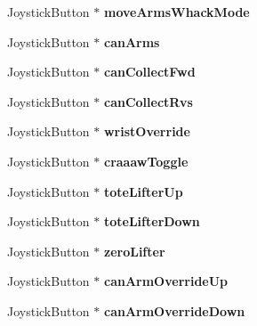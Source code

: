 \begin{DoxyCompactItemize}
\item 
\hypertarget{class_o_i_a2f5f57a5ddbfbfa7d64f2badf07ab1af}{}Joystick\+Button $\ast$ {\bfseries move\+Arms\+Whack\+Mode}\label{class_o_i_a2f5f57a5ddbfbfa7d64f2badf07ab1af}

\item 
\hypertarget{class_o_i_ab1b2d1e372da50b19d3a31ef03c19943}{}Joystick\+Button $\ast$ {\bfseries can\+Arms}\label{class_o_i_ab1b2d1e372da50b19d3a31ef03c19943}

\item 
\hypertarget{class_o_i_a448dc3e19c0890b55b51b83b8fa35567}{}Joystick\+Button $\ast$ {\bfseries can\+Collect\+Fwd}\label{class_o_i_a448dc3e19c0890b55b51b83b8fa35567}

\item 
\hypertarget{class_o_i_acc977a5af7ac481ebb561161384299f8}{}Joystick\+Button $\ast$ {\bfseries can\+Collect\+Rvs}\label{class_o_i_acc977a5af7ac481ebb561161384299f8}

\item 
\hypertarget{class_o_i_ae065075f763eb9a282dd017848e6e279}{}Joystick\+Button $\ast$ {\bfseries wrist\+Override}\label{class_o_i_ae065075f763eb9a282dd017848e6e279}

\item 
\hypertarget{class_o_i_a51da9d9aec6d2f6b89e663428a567f43}{}Joystick\+Button $\ast$ {\bfseries craaaw\+Toggle}\label{class_o_i_a51da9d9aec6d2f6b89e663428a567f43}

\item 
\hypertarget{class_o_i_ae8d9bbb4b6fc16b8ff7a386b55795dcb}{}Joystick\+Button $\ast$ {\bfseries tote\+Lifter\+Up}\label{class_o_i_ae8d9bbb4b6fc16b8ff7a386b55795dcb}

\item 
\hypertarget{class_o_i_ad63f1e29bf862c03f710c422e0ba277e}{}Joystick\+Button $\ast$ {\bfseries tote\+Lifter\+Down}\label{class_o_i_ad63f1e29bf862c03f710c422e0ba277e}

\item 
\hypertarget{class_o_i_a688192ea6f7f4cda696fa5d598094fb2}{}Joystick\+Button $\ast$ {\bfseries zero\+Lifter}\label{class_o_i_a688192ea6f7f4cda696fa5d598094fb2}

\item 
\hypertarget{class_o_i_a789b8e21817392b5e9f5a84086dabc0e}{}Joystick\+Button $\ast$ {\bfseries can\+Arm\+Override\+Up}\label{class_o_i_a789b8e21817392b5e9f5a84086dabc0e}

\item 
\hypertarget{class_o_i_ab9e4213494a50797201a4eb9808d72dc}{}Joystick\+Button $\ast$ {\bfseries can\+Arm\+Override\+Down}\label{class_o_i_ab9e4213494a50797201a4eb9808d72dc}


\end{DoxyCompactItemize}
